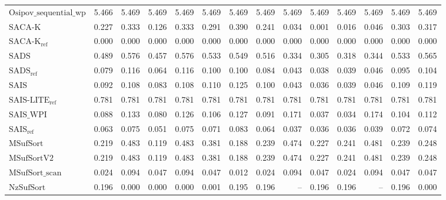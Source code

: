 \begin{table}[h]
{\begin{tabular}{lrrrrrrrrrrrrr}
    $\text{Osipov\_sequential\_wp}$ & {\color{red}5.466} & {\color{red}5.469} & {\color{red}5.469} & {\color{red}5.469} & {\color{red}5.469} & {\color{red}5.469} & {\color{red}5.469} & {\color{red}5.469} & {\color{red}5.469} & {\color{red}5.469} & {\color{red}5.469} & {\color{red}5.469} & {\color{red}5.469} \\
    $\text{SACA-K}$ & 0.227 & 0.333 & 0.126 & 0.333 & 0.291 & 0.390 & 0.241 & 0.034 & 0.001 & 0.016 & 0.046 & 0.303 & 0.317 \\
    $\text{SACA-K}_{\text{ref}}$ & {\color{green!60!black}0.000} & {\color{green!60!black}0.000} & {\color{green!60!black}0.000} & {\color{green!60!black}0.000} & {\color{green!60!black}0.000} & {\color{green!60!black}0.000} & {\color{green!60!black}0.000} & {\color{green!60!black}0.000} & {\color{green!60!black}0.000} & {\color{green!60!black}0.000} & {\color{green!60!black}0.000} & {\color{green!60!black}0.000} & {\color{green!60!black}0.000} \\
    $\text{SADS}$ & 0.489 & 0.576 & 0.457 & 0.576 & 0.533 & 0.549 & 0.516 & 0.334 & 0.305 & 0.318 & 0.344 & 0.533 & 0.565 \\
    $\text{SADS}_{\text{ref}}$ & 0.079 & 0.116 & 0.064 & 0.116 & 0.100 & 0.100 & 0.084 & 0.043 & 0.038 & 0.039 & 0.046 & 0.095 & 0.104 \\
    $\text{SAIS}$ & 0.092 & 0.108 & 0.083 & 0.108 & 0.110 & 0.125 & 0.100 & 0.043 & 0.036 & 0.039 & 0.046 & 0.109 & 0.119 \\
    $\text{SAIS-LITE}_{\text{ref}}$ & 0.781 & 0.781 & 0.781 & 0.781 & 0.781 & 0.781 & 0.781 & 0.781 & 0.781 & 0.781 & 0.781 & 0.781 & 0.781 \\
    $\text{SAIS\_WPI}$ & 0.088 & 0.133 & 0.080 & 0.126 & 0.106 & 0.127 & 0.091 & 0.171 & 0.037 & 0.034 & 0.174 & 0.104 & 0.112 \\
    $\text{SAIS}_{\text{ref}}$ & 0.063 & 0.075 & 0.051 & 0.075 & 0.071 & 0.083 & 0.064 & 0.037 & 0.036 & 0.036 & 0.039 & 0.072 & 0.074 \\
    $\text{MSufSort}$ & 0.219 & 0.483 & 0.119 & 0.483 & 0.381 & 0.188 & 0.239 & 0.474 & 0.227 & 0.241 & 0.481 & 0.239 & 0.248 \\
    $\text{MSufSortV2}$ & 0.219 & 0.483 & 0.119 & 0.483 & 0.381 & 0.188 & 0.239 & 0.474 & 0.227 & 0.241 & 0.481 & 0.239 & 0.248 \\
    $\text{MSufSort\_scan}$ & 0.024 & 0.094 & 0.047 & 0.094 & 0.047 & 0.012 & 0.024 & 0.094 & 0.047 & 0.024 & 0.094 & 0.047 & 0.047 \\
    $\text{NzSufSort}$ & 0.196 & {\color{green!60!black}0.000} & {\color{green!60!black}0.000} & {\color{green!60!black}0.000} & 0.001 & 0.195 & 0.196 & {\color{darkgray}--} & 0.196 & 0.196 & {\color{darkgray}--} & 0.196 & 0.000 \\

\end{tabular}}
\end{table}
